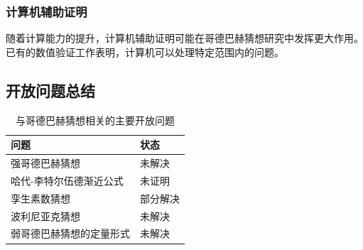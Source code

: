 \subsubsection{计算机辅助证明}

随着计算能力的提升，计算机辅助证明可能在哥德巴赫猜想研究中发挥更大作用。已有的数值验证工作表明，计算机可以处理特定范围内的问题。

\subsection{开放问题总结}

\begin{table}[htbp]
    \centering
    \caption{与哥德巴赫猜想相关的主要开放问题}
    \label{tab:open_problems}
    \begin{tabular}{@{}ll@{}}
        \toprule
        \textbf{问题} & \textbf{状态} \\
        \midrule
        强哥德巴赫猜想 & 未解决 \\
        哈代-李特尔伍德渐近公式 & 未证明 \\
        孪生素数猜想 & 部分解决 \\
        波利尼亚克猜想 & 未解决 \\
        弱哥德巴赫猜想的定量形式 & 未解决 \\
        \bottomrule
    \end{tabular}
\end{table}
